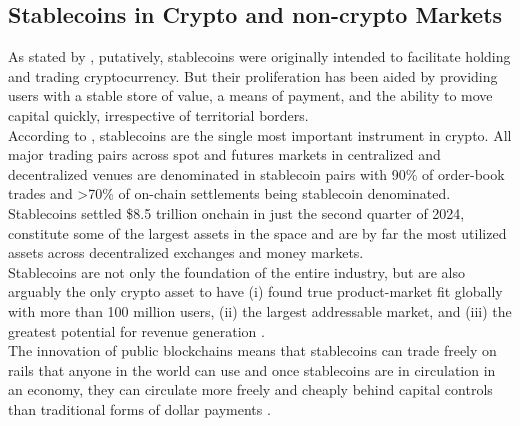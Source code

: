 \documentclass[12pt,a4paper,titlepage,oneside,english]{article}
\begin{document}
\subsection{Stablecoins in Crypto and non-crypto Markets}
As stated by \parencite{Miran_Stablecoin}, putatively, stablecoins were originally intended to facilitate holding and trading cryptocurrency. But their proliferation has been aided by providing users with a stable store of value, a means of payment, and the ability to move capital quickly, irrespective of territorial borders.\parencite{Miran_Stablecoin}\\
According to \parencite{ethena_docs}, stablecoins are the single most important instrument in crypto. All major trading pairs across spot and futures markets in centralized and decentralized venues are denominated in stablecoin pairs with 90\% of order-book trades and >70\% of on-chain settlements being stablecoin denominated. Stablecoins settled \$8.5 trillion onchain in just the second quarter of 2024, constitute some of the largest assets in the space and are by far the most utilized assets across decentralized exchanges and money markets\parencite{ethena_docs}.\\
Stablecoins are not only the foundation of the entire industry, but are also arguably the only crypto asset to have (i) found true product-market fit globally with more than 100 million users, (ii) the largest addressable market, and (iii) the greatest potential for revenue generation \parencite{ethena_docs}.\\
The innovation of public blockchains means that stablecoins can trade freely on rails
that anyone in the world can use and once stablecoins are in circulation in an economy, they can circulate more freely and cheaply behind capital controls than traditional forms of dollar payments \parencite{Miran_Stablecoin}.
\end{document}
